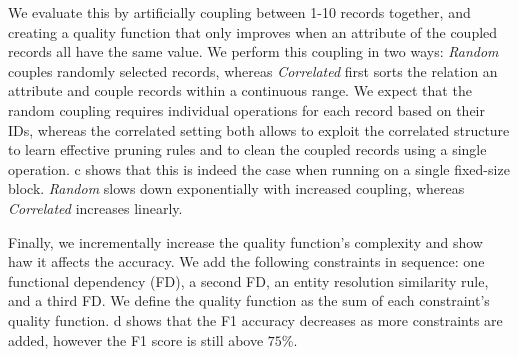 We evaluate this by artificially coupling between 1-10 records together, and creating a quality function that only improves when an attribute of the coupled records all have the same value.  We perform this coupling in two ways: {\it Random} couples randomly selected records, whereas {\it Correlated} first sorts the relation an attribute and couple records within a continuous range.  We expect that the random coupling requires individual operations for each record based on their IDs, whereas the correlated setting both allows \sys to exploit the correlated structure to learn effective pruning rules and to clean the coupled records using a single operation.  c shows that this is indeed the case when running \sys on a single fixed-size block. {\it Random} slows down exponentially with increased coupling, whereas {\it Correlated} increases linearly.


 Finally, we incrementally increase the quality function's complexity and show haw it affects the accuracy.  We add the following constraints in sequence: one functional dependency (FD), a second FD, an entity resolution similarity rule, and a third FD.  We define the quality function as the sum of each constraint's quality function.   d shows that the F1 accuracy decreases as more constraints are added, however the F1 score is still above $75\%$.  




